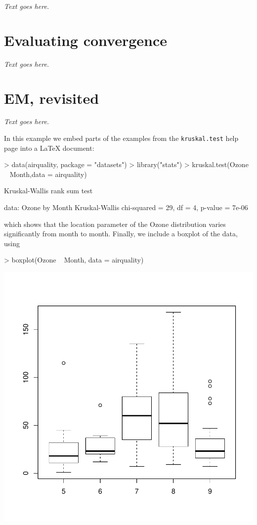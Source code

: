 \documentclass[final]{siamart171218}
\begin{document}
{\em Text goes here.}

\section{Evaluating convergence}

{\em Text goes here.}

\section{EM, revisited}

{\em Text goes here.}

In this example we embed parts of the examples from the
\texttt{kruskal.test} help page into a \LaTeX{} document:
\begin{Schunk}
\begin{Sinput}
> data(airquality, package = "datasets")
> library("stats")
> kruskal.test(Ozone ~ Month,data = airquality)
\end{Sinput}
\begin{Soutput}
	Kruskal-Wallis rank sum test

data:  Ozone by Month
Kruskal-Wallis chi-squared = 29, df = 4, p-value = 7e-06
\end{Soutput}
\end{Schunk}

which shows that the location parameter of the Ozone distribution
varies significantly from month to month. Finally, we include a
boxplot of the data, using
\begin{Schunk}
\begin{Sinput}
> boxplot(Ozone ~ Month, data = airquality)
\end{Sinput}
\end{Schunk}
\begin{center} 
\includegraphics{algorithms-004}
\end{center}
\end{document}
